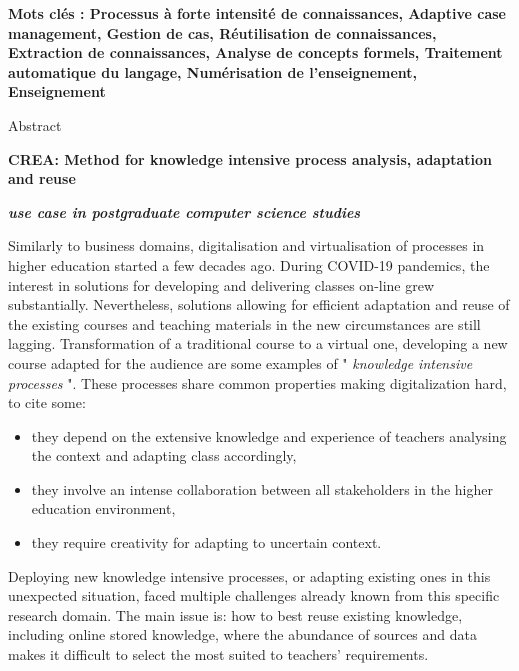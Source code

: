 
\bigskip

\textbf{Mots clés :
Processus à forte intensité de connaissances,
Adaptive case management,
Gestion de cas,
Réutilisation de connaissances,
Extraction de connaissances,
Analyse de concepts formels,
Traitement automatique du langage,
Numérisation de l'enseignement,
Enseignement}


\newpage


\shorthandoff{:} %

\begin{center}
\begin{LARGE}
Abstract
\end{LARGE}

\bigskip

\textbf{CREA: Method for knowledge intensive process analysis, adaptation and reuse}

\textbf{\textit{use case in postgraduate computer science studies}}

\end{center}

\bigskip



Similarly to business domains, digitalisation and virtualisation of processes in higher education started a few decades ago.
During COVID-19 pandemics, the interest in solutions for developing and delivering classes on-line grew substantially.
Nevertheless, solutions allowing for efficient adaptation and reuse of the existing courses and teaching materials in the new circumstances are still lagging.
Transformation of a traditional course to a virtual one, developing a new course adapted for the audience are some examples of  " \textit{knowledge intensive processes} ".
These processes share common properties making digitalization hard, to cite some:
\begin{itemize}
\item they depend on the extensive knowledge and experience of teachers analysing the context and adapting class accordingly,
\item they involve an intense collaboration between all stakeholders in the higher education environment,
\item they require creativity for adapting to uncertain context.
\end{itemize}
Deploying new knowledge intensive processes, or adapting existing ones in this unexpected situation, faced multiple challenges already known from this specific research domain.
The main issue is: how to best reuse existing knowledge, including online stored knowledge, where the abundance of sources and data makes it difficult to select the most suited to teachers' requirements.

